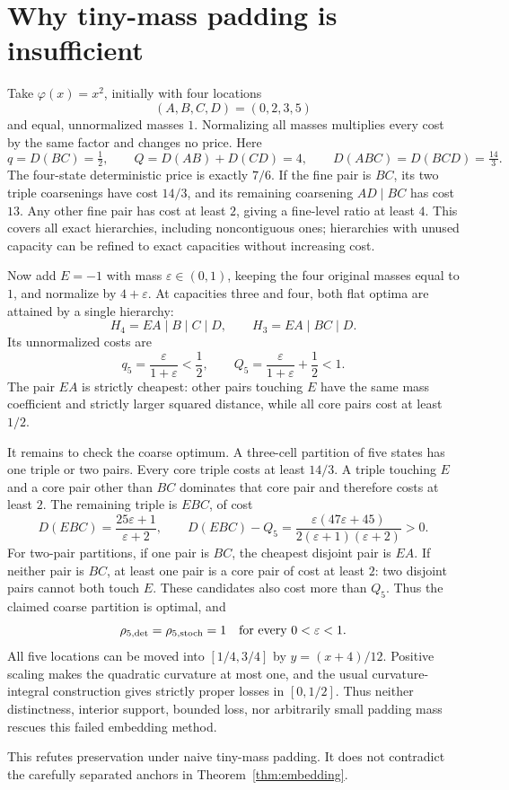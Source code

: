 \section{Why tiny-mass padding is insufficient}
\label{sec:padding}

Take $\varphi(x)=x^2$, initially with four locations
\[
 (A,B,C,D)=(0,2,3,5)
\]
and equal, unnormalized masses $1$.  Normalizing all masses multiplies
every cost by the same factor and changes no price.  Here
\[
 q=D(BC)=\tfrac12,\qquad
 Q=D(AB)+D(CD)=4,\qquad
 D(ABC)=D(BCD)=\tfrac{14}{3}.
\]
The four-state deterministic price is exactly $7/6$.  If the fine pair is
$BC$, its two triple coarsenings have cost $14/3$, and its remaining
coarsening $AD\mid BC$ has cost $13$.  Any other fine pair has cost at
least $2$, giving a fine-level ratio at least $4$.  This covers all exact
hierarchies, including noncontiguous ones; hierarchies with unused capacity
can be refined to exact capacities without increasing cost.

Now add $E=-1$ with mass $\varepsilon\in(0,1)$, keeping the four original
masses equal to $1$, and normalize by $4+\varepsilon$.  At capacities three
and four, both flat optima are attained by a single hierarchy:
\[
 H_4=EA\mid B\mid C\mid D,
 \qquad H_3=EA\mid BC\mid D.
\]
Its unnormalized costs are
\[
 q_5=\frac{\varepsilon}{1+\varepsilon}<\frac12,
 \qquad
 Q_5=\frac{\varepsilon}{1+\varepsilon}+\frac12<1.
\]
The pair $EA$ is strictly cheapest: other pairs touching $E$ have the same
mass coefficient and strictly larger squared distance, while all core
pairs cost at least $1/2$.

It remains to check the coarse optimum.  A three-cell partition of five
states has one triple or two pairs.  Every core triple costs at least
$14/3$.  A triple touching $E$ and a core pair other than $BC$ dominates
that core pair and therefore costs at least $2$.  The remaining triple is
$EBC$, of cost
\[
 D(EBC)=\frac{25\varepsilon+1}{\varepsilon+2},\qquad
 D(EBC)-Q_5
 =\frac{\varepsilon(47\varepsilon+45)}
 {2(\varepsilon+1)(\varepsilon+2)}>0.
\]
For two-pair partitions, if one pair is $BC$, the cheapest disjoint pair
is $EA$.  If neither pair is $BC$, at least one pair is a core pair of cost
at least $2$: two disjoint pairs cannot both touch $E$.  These candidates
also cost more than $Q_5$.  Thus the claimed coarse partition is optimal,
and
\[
 \rho_{5,\mathrm{det}}=\rho_{5,\mathrm{stoch}}=1
 \quad\hbox{for every }0<\varepsilon<1.
\]
All five locations can be moved into $[1/4,3/4]$ by
$y=(x+4)/12$.  Positive scaling makes the quadratic curvature at most one,
and the usual curvature-integral construction gives strictly proper losses
in $[0,1/2]$.  Thus neither distinctness, interior support, bounded loss,
nor arbitrarily small padding mass rescues this failed embedding method.


This refutes preservation under naive tiny-mass padding. It does not
contradict the carefully separated anchors in Theorem~\ref{thm:embedding}.
